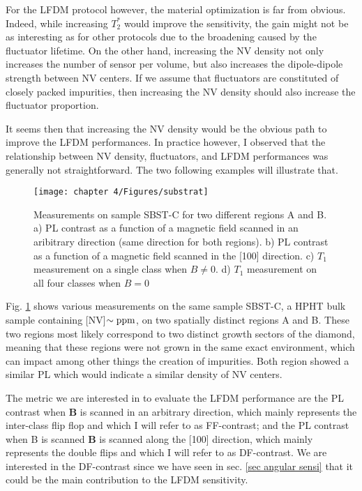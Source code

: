 \documentclass[a4paper,11pt]{report}
\begin{document}
\begin{refsection}
For the LFDM protocol however, the material optimization is far from obvious. Indeed, while increasing $T_2^*$ would improve the sensitivity, the gain might not be as interesting as for other protocols due to the broadening caused by the fluctuator lifetime. On the other hand, increasing the NV density not only increases the number of sensor per volume, but also increases the dipole-dipole strength between NV centers. If we assume that fluctuators are constituted of closely packed impurities, then increasing the NV density should also increase the fluctuator proportion.

It seems then that increasing the NV density would be the obvious path to improve the LFDM performances. In practice however, I observed that the relationship between NV density, fluctuators, and LFDM performances was generally not straightforward. The two following examples will illustrate that.

\begin{figure}[h!]
\centering
\texttt{[image: chapter 4/Figures/substrat]}
\caption{Measurements on sample SBST-C for two different regions A and B. a) PL contrast as a function of a magnetic field scanned in an aribitrary direction (same direction for both regions). b) PL contrast as a function of a magnetic field scanned in the [100] direction. c) $T_1$ measurement on a single class when $B\neq 0$. d) $T_1$ measurement on all  four classes when $B=0$ }
\label{substrat chelou}
\end{figure}

Fig. \ref{substrat chelou} shows various measurements on the same sample SBST-C, a HPHT bulk sample containing [NV]$\sim  \rm ppm$, on two spatially distinct regions A and B. These two regions most likely correspond to two distinct growth sectors of the diamond, meaning that these regions were not grown in the same exact environment, which can impact among other things the creation of impurities. Both region showed a similar PL which would indicate a similar density of NV centers.

The metric we are interested in to evaluate the LFDM performance are the PL contrast when $\mathbf{B}$ is scanned in an arbitrary direction, which mainly represents the inter-class flip flop and which I will refer to as FF-contrast; and the PL contrast when B is scanned $\mathbf{B}$ is scanned along the [100] direction, which mainly represents the double flips and which I will refer to as DF-contrast. We are interested in the DF-contrast since we have seen in sec. \ref{sec angular sensi} that it could be the main contribution to the LFDM sensitivity.


\end{refsection}
\end{document}
